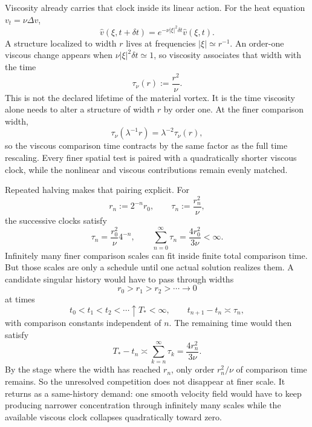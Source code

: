 Viscosity already carries that clock inside its linear action.
For the heat equation \(v_t=\nu\Delta v\),
\[
  \widehat v(\xi,t+\delta t)
  =
  e^{-\nu|\xi|^2\delta t}\widehat v(\xi,t).
\]
A structure localized to width \(r\) lives at frequencies \(|\xi|\simeq r^{-1}\).
An order-one viscous change appears when \(\nu|\xi|^2\delta t\simeq1\), so viscosity associates that width with the time
\[
  \tau_\nu(r)
  :=
  \frac{r^2}{\nu}.
\]
This is not the declared lifetime of the material vortex.
It is the time viscosity alone needs to alter a structure of width \(r\) by order one.
At the finer comparison width,
\[
  \tau_\nu(\lambda^{-1}r)
  =
  \lambda^{-2}\tau_\nu(r),
\]
so the viscous comparison time contracts by the same factor as the full \NavierStokes{} time rescaling.
Every finer spatial test is paired with a quadratically shorter viscous clock, while the nonlinear and viscous contributions remain evenly matched.


Repeated halving makes that pairing explicit.
For
\[
  r_n:=2^{-n}r_0,
  \qquad
  \tau_n:=\frac{r_n^2}{\nu},
\]
the successive clocks satisfy
\[
  \tau_n
  =
  \frac{r_0^2}{\nu}4^{-n},
  \qquad
  \sum_{n=0}^{\infty}\tau_n
  =
  \frac{4r_0^2}{3\nu}
  <
  \infty.
\]
Infinitely many finer comparison scales can fit inside finite total comparison time.
But those scales are only a schedule until one actual solution realizes them.
A candidate singular history would have to pass through widths
\[
  r_0>r_1>r_2>\cdots\longrightarrow0
\]
at times
\[
  t_0<t_1<t_2<\cdots\uparrow T_*<\infty,
  \qquad
  t_{n+1}-t_n\asymp\tau_n,
\]
with comparison constants independent of \(n\).
The remaining time would then satisfy
\[
  T_*-t_n
  \asymp
  \sum_{k=n}^{\infty}\tau_k
  =
  \frac{4r_n^2}{3\nu}.
\]
By the stage where the width has reached \(r_n\), only order \(r_n^2/\nu\) of comparison time remains.
So the unresolved competition does not disappear at finer scale.
It returns as a same-history demand: one smooth velocity field would have to keep producing narrower concentration through infinitely many scales while the available viscous clock collapses quadratically toward zero.
